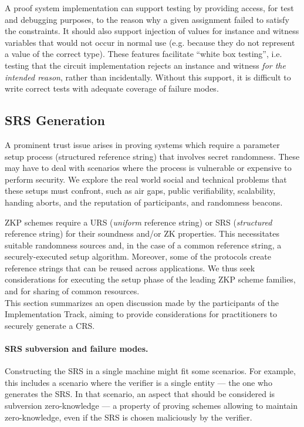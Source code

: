 A proof system implementation can support testing by providing access, for test and debugging purposes, to the reason why a given assignment failed to satisfy the constraints. It should also support injection of values for instance and witness variables that would not occur in normal use (e.g. because they do not represent a value of the correct type). These features facilitate “white box testing”, i.e. testing that the circuit implementation rejects an instance and witness \emph{for the intended reason}, rather than incidentally. Without this support, it is difficult to write correct tests with adequate coverage of failure modes.


\subsection{SRS Generation}
\label{implem:correctness:SRS-gen}

A prominent trust issue arises in proving systems which require a parameter setup process (structured reference string) that involves secret randomness. 
These may have to deal with scenarios where the process is vulnerable or expensive to perform security. 
We explore the real world social and technical problems that these setups must confront, such as air gaps, public verifiability, scalability, handing aborts, and the reputation of participants, and randomness beacons.

ZKP schemes require a URS (\emph{uniform} reference string) or SRS (\emph{structured} reference string) for their soundness and/or ZK properties. 
This necessitates suitable randomness sources and, in the case of a common reference string, a securely-executed setup algorithm. 
Moreover, some of the protocols create reference strings that can be reused across applications. 
We thus seek considerations for executing the setup phase of the leading ZKP scheme families, and for sharing of common resources.\\
This section summarizes an open discussion made by the participants of the Implementation Track, aiming to provide considerations for practitioners to securely generate a CRS.


\paragraph{SRS subversion and failure modes.}
Constructing the SRS in a single machine might fit some scenarios. 
For example, this includes a scenario where the verifier is a single entity --- the one who generates the SRS. 
In that scenario, an aspect that should be considered is subversion zero-knowledge --- a property of proving schemes allowing to maintain zero-knowledge, even if the SRS is chosen maliciously by the verifier.


